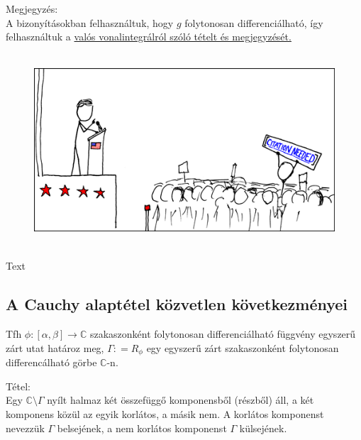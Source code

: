 \documentclass[12pt,a4paper]{scrartcl}
\newenvironment{tetel}{}{}
\newenvironment{bizonyitas}{}{}
\newenvironment{megjegyzes}{}{}
\newenvironment{ajanlofig}{\begin{figure}\begin{center}}{
\end{center}\end{figure}}
\begin{document}
\begin{bizonyitas}
\end{bizonyitas}

\begin{megjegyzes}

Megjegyzés:\\
A bizonyításokban felhasználtuk, hogy \(g\) folytonosan
differenciálható, így felhasználtuk a
\protect\hyperlink{zartgorbe}{valós vonalintegrálról szóló tételt és
megjegyzését.}

\end{megjegyzes}

\begin{ajanlo}

\begin{ajanlofig}

\href{https://xkcd.com}{\includegraphics[width=5.20833in,height=2.82292in]{wikipedian_protester.png}}

\end{ajanlofig}

Text

\end{ajanlo}

\hypertarget{a-cauchy-alaptetel-kozvetlen-kovetkezmenyei}{%
\subsection{A Cauchy alaptétel közvetlen
következményei}\label{a-cauchy-alaptetel-kozvetlen-kovetkezmenyei}}

Tfh
\(\left. \phi:\left\lbrack {\alpha,\beta} \right\rbrack\rightarrow{\mathbb{C}} \right.\)
szakaszonként folytonosan differenciálható függvény egyszerű zárt utat
határoz meg, \(\Gamma: = R_{\phi}\) egy egyszerű zárt szakaszonként
folytonosan differencálható görbe \(\mathbb{C}\)-n.

\begin{tetel}

Tétel:\\
Egy \({\mathbb{C}}\text{\textbackslash}\Gamma\) nyílt halmaz két
összefüggő komponensből (részből) áll, a két komponens közül az egyik
korlátos, a másik nem. A korlátos komponenst nevezzük \(\Gamma\)
belsejének, a nem korlátos komponenst \(\Gamma\) külsejének.

\end{tetel}
\end{document}
